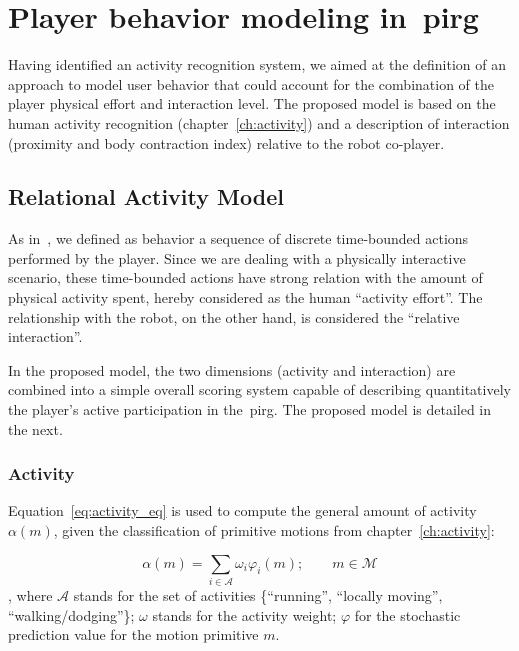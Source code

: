 \chapter{Player behavior modeling in~\glsdesc{pirg}}\label{ch:modeling}

Having identified an activity recognition system, we aimed at the definition of an approach to model user behavior that could account for the combination of the player physical effort and interaction level. The proposed model is based on the human activity recognition (chapter~\ref{ch:activity}) and a description of interaction (proximity and body contraction index) relative to the robot co-player.

\section{Relational Activity Model}\label{theModel}

As in~\cite{etheredge_generic_2013}, we defined as behavior a sequence of discrete time-bounded actions performed by the player. Since we are dealing with a physically interactive scenario, these time-bounded actions have strong relation with the amount of physical activity spent, hereby considered as the human ``activity effort''. The relationship with the robot, on the other hand, is considered the ``relative interaction''. 

In the proposed model, the two dimensions (activity and interaction) are combined into a simple overall scoring system capable of describing quantitatively the player's active participation in the~\gls{pirg}. The proposed model is detailed in the next.

\subsection{Activity}\label{activity}

Equation~\ref{eq:activity_eq} is used to compute the general amount of activity $\alpha(m)$, given the classification of primitive motions from chapter~\ref{ch:activity}:

\begin{equation}
	\alpha(m)=\sum_{i \in \mathcal{A}} \omega_{i}\varphi_i(m);\qquad m \in \mathcal{M}
	\label{eq:activity_eq}
\end{equation}
, where $\mathcal{A}$ stands for the set of activities \{``running'', ``locally moving'', ``walking/dodging''\}; $\omega$ stands for the activity weight; $\varphi$ for the stochastic prediction value for the motion primitive $m$.

